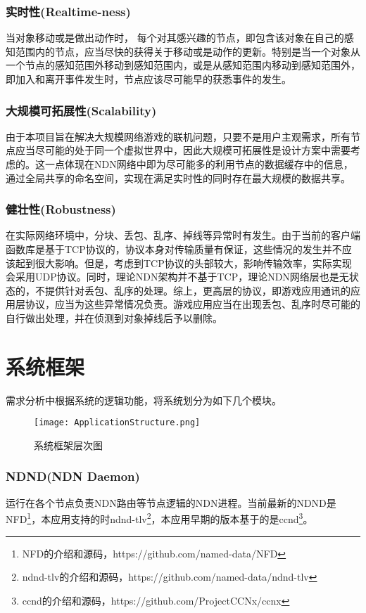 \subsubsection{实时性(Realtime-ness)}
\par
当对象移动或是做出动作时， 每个对其感兴趣的节点，即包含该对象在自己的感知范围内的节点，应当尽快的获得关于移动或是动作的更新。特别是当一个对象从一个节点的感知范围外移动到感知范围内，或是从感知范围内移动到感知范围外，即加入和离开事件发生时，节点应该尽可能早的获悉事件的发生。
\subsubsection{大规模可拓展性(Scalability)}
\par
由于本项目旨在解决大规模网络游戏的联机问题，只要不是用户主观需求，所有节点应当尽可能的处于同一个虚拟世界中，因此大规模可拓展性是设计方案中需要考虑的。这一点体现在NDN网络中即为尽可能多的利用节点的数据缓存中的信息，通过全局共享的命名空间，实现在满足实时性的同时存在最大规模的数据共享。
\subsubsection{健壮性(Robustness)}
\par
在实际网络环境中，分块、丢包、乱序、掉线等异常时有发生。由于当前的客户端函数库是基于TCP协议的，协议本身对传输质量有保证，这些情况的发生并不应该起到很大影响。但是，考虑到TCP协议的头部较大，影响传输效率，实际实现会采用UDP协议。同时，理论NDN架构并不基于TCP，理论NDN网络层也是无状态的，不提供针对丢包、乱序的处理。综上，更高层的协议，即游戏应用通讯的应用层协议，应当为这些异常情况负责。游戏应用应当在出现丢包、乱序时尽可能的自行做出处理，并在侦测到对象掉线后予以删除。
\section{系统框架}
\setcounter{subsubsection}{0}
\par
需求分析中根据系统的逻辑功能，将系统划分为如下几个模块。
\begin{figure}[h!]
	\centering
	\texttt{[image: ApplicationStructure.png]}
	\caption{系统框架层次图}
	\label{fig:AbstractStructure}
\end{figure}
\par
\subsubsection{NDND(NDN Daemon)}
\par
运行在各个节点负责NDN路由等节点逻辑的NDN进程。当前最新的NDND是NFD\footnote{NFD的介绍和源码，https://github.com/named-data/NFD}，本应用支持的时ndnd-tlv\footnote{ndnd-tlv的介绍和源码，https://github.com/named-data/ndnd-tlv}，本应用早期的版本基于的是ccnd\footnote{ccnd的介绍和源码，https://github.com/ProjectCCNx/ccnx}。
